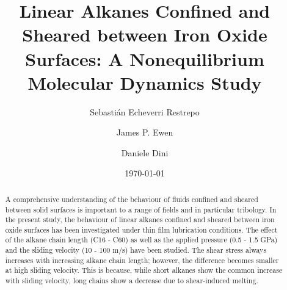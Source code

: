 \documentclass[aps,prb,reprint,superscriptaddress, a4paper]{revtex4-1}
\begin{document}

\title{Linear Alkanes Confined and Sheared between Iron Oxide Surfaces: A Nonequilibrium Molecular Dynamics Study}


\author{Sebasti\'{a}n Echeverri Restrepo}
\author{James P. Ewen}
\author{Daniele Dini}


\date{\today}

\begin{abstract}
A comprehensive understanding of the behaviour of fluids confined and sheared between solid surfaces is important to a range of fields and in particular tribology. In the present study, the behaviour of linear alkanes confined and sheared between iron oxide surfaces has been investigated under thin film lubrication conditions. The effect of the alkane chain length (C16 - C60) as well as the applied pressure (0.5 - 1.5 GPa) and the sliding velocity (10 - 100 m/s) have been studied. The shear stress always increases with increasing alkane chain length; however, the difference becomes smaller at high sliding velocity. This is because, while short alkanes show the common increase with sliding velocity, long chains show a decrease due to shear-induced melting.

\end{abstract}
\end{document}
